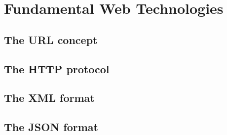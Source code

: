 
\section{Fundamental Web Technologies}
\label{sec:web_fundamentals}

\subsection{The \gls{URL} concept}
\label{subsec:url_concept}


\subsection{The \gls{HTTP} protocol}
\label{subsec:http_protocol}


\subsection{The \gls{XML} format}
\label{subsec:xml_format}


\subsection{The \gls{JSON} format}
\label{subsec:json_format}



